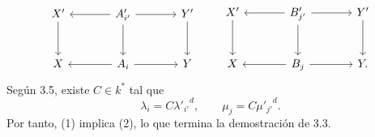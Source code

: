 \[
\begin{tikzcd}[column sep=large,row sep=large]
X' \arrow[d] & A'_{i'} \arrow[l] \arrow[r] \arrow[d] & Y' \arrow[d]\\
X & A_i \arrow[l] \arrow[r] & Y
\end{tikzcd}
\qquad
\begin{tikzcd}[column sep=large,row sep=large]
X' \arrow[d] & B'_{j'} \arrow[l] \arrow[r] \arrow[d] & Y' \arrow[d]\\
X & B_j \arrow[l] \arrow[r] & Y .
\end{tikzcd}
\]
Según 3.5, existe $C\in k^*$ tal que
\[
\lambda_i=C{\lambda'_{i'}}^d,\qquad
\mu_j=C{\mu'_{j'}}^d.
\]
Por tanto, (1) implica (2), lo que termina la demostración de 3.3.
